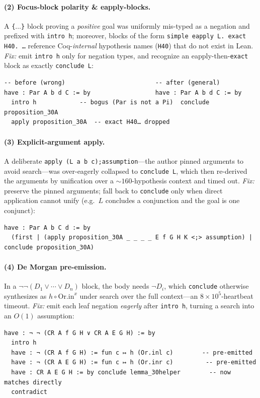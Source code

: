 \documentclass{article}
\begin{document}
\paragraph{(2) Focus-block polarity \& eapply-blocks.} A \texttt{\{$\ldots$\}} block proving a
\emph{positive} goal was uniformly mis-typed as a negation and prefixed with \texttt{intro h};
moreover, blocks of the form \texttt{simple eapply L. exact H40. \ldots} reference
Coq-\emph{internal} hypothesis names (\texttt{H40}) that do not exist in Lean. \emph{Fix:}
emit \texttt{intro h} only for negation types, and recognize an eapply-then-\texttt{exact} block
as exactly \texttt{conclude L}:
\begin{lstlisting}
-- before (wrong)                         -- after (general)
have : Par A b d C := by                  have : Par A b d C := by
  intro h            -- bogus (Par is not a Pi)  conclude proposition_30A
  apply proposition_30A  -- exact H40… dropped
\end{lstlisting}

\paragraph{(3) Explicit-argument apply.} A deliberate \texttt{apply (L a b c);assumption}---the
author pinned arguments to avoid search---was over-eagerly collapsed to \texttt{conclude L},
which then re-derived the arguments by unification over a ${\sim}160$-hypothesis context and
timed out. \emph{Fix:} preserve the pinned arguments; fall back to \texttt{conclude} only when
direct application cannot unify (e.g.\ $L$ concludes a conjunction and the goal is one conjunct):
\begin{lstlisting}
have : Par A b C d := by
  (first | (apply proposition_30A _ _ _ _ E f G H K <;> assumption) | conclude proposition_30A)
\end{lstlisting}

\paragraph{(4) De Morgan pre-emission.} In a $\neg\neg(D_1 \vee \cdots \vee D_n)$ block, the body
needs $\neg D_i$, which \texttt{conclude} otherwise synthesizes as $h \circ \mathrm{Or.in}^x$
under search over the full context---an $8{\times}10^5$-heartbeat timeout. \emph{Fix:} emit each
leaf negation \emph{eagerly} after \texttt{intro h}, turning a search into an $O(1)$ assumption:
\begin{lstlisting}
have : ¬ ¬ (CR A f G H ∨ CR A E G H) := by
  intro h
  have : ¬ (CR A f G H) := fun c ↦ h (Or.inl c)        -- pre-emitted
  have : ¬ (CR A E G H) := fun c ↦ h (Or.inr c)         -- pre-emitted
  have : CR A E G H := by conclude lemma_30helper        -- now matches directly
  contradict
\end{lstlisting}
\end{document}
